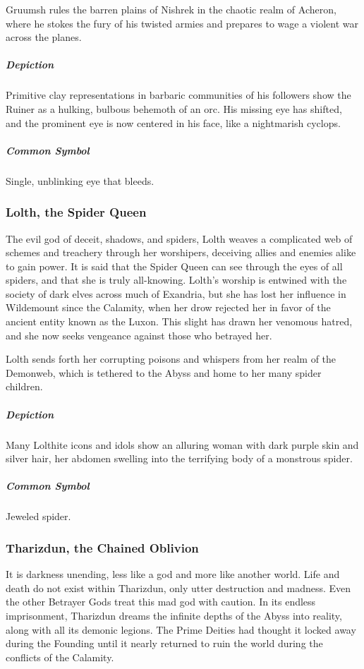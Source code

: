 \documentclass[letterpaper, twocolumn, openany, nodeprecatedcode, layout=true]{dndbook}
\begin{document}
Gruumsh rules the barren plains of Nishrek in the chaotic realm of Acheron, where he stokes
the fury of his twisted armies and prepares to wage a violent war across the planes.

\subparagraph{Depiction}
Primitive clay representations in barbaric communities of his followers show the Ruiner as a
hulking, bulbous behemoth of an orc. His missing eye has shifted, and the prominent eye is now
centered in his face, like a nightmarish cyclops.

\subparagraph{Common Symbol}
Single, unblinking eye that bleeds.

\subsubsection{Lolth, the Spider Queen}

The evil god of deceit, shadows, and spiders, Lolth weaves a complicated web of schemes and
treachery through her worshipers, deceiving allies and enemies alike to gain power. It is
said that the Spider Queen can see through the eyes of all spiders, and that she is truly
all-knowing. Lolth’s worship is entwined with the society of dark elves across much of
Exandria, but she has lost her influence in Wildemount since the Calamity, when her drow
rejected her in favor of the ancient entity known as the Luxon. This slight has drawn her
venomous hatred, and she now seeks vengeance against those who betrayed her.

Lolth sends forth her corrupting poisons and whispers from her realm of the Demonweb,
which is tethered to the Abyss and home to her many spider children.

\subparagraph{Depiction}
Many Lolthite icons and idols show an alluring woman with dark purple skin and silver
hair, her abdomen swelling into the terrifying body of a monstrous spider.

\subparagraph{Common Symbol}
Jeweled spider.

\subsubsection{Tharizdun, the Chained Oblivion}

It is darkness unending, less like a god and more like another world. Life and death do
not exist within Tharizdun, only utter destruction and madness. Even the other Betrayer
Gods treat this mad god with caution. In its endless imprisonment, Tharizdun dreams the
infinite depths of the Abyss into reality, along with all its demonic legions. The Prime
Deities had thought it locked away during the Founding until it nearly returned to ruin
the world during the conflicts of the Calamity.
\end{document}
